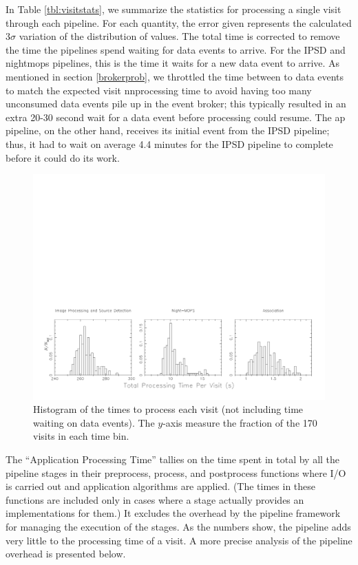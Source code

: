 In Table \ref{tbl:visitstats}, we summarize the statistics for processing
a single visit through each pipeline.  For each quantity, the error
given represents the calculated $3\sigma$ variation of the
distribution of values.  The total time is corrected to remove the
time the pipelines spend waiting for data events to arrive.  For the
IPSD and nightmops pipelines, this is the time it waits for a new data
event to arrive.  As mentioned in section \ref{brokerprob}, we
throttled the time between to data events to match the expected visit
nnprocessing time to avoid having too many unconsumed data events pile
up in the event broker; this typically resulted in an extra 20-30
second wait for a data event before processing could resume.  The ap
pipeline, on the other hand, receives its initial event from the IPSD
pipeline; thus, it had to wait on average 4.4 minutes for the IPSD
pipeline to complete before it could do its work.

\begin{figure}[htbp]
\begin{center}
\includegraphics[width=\textwidth,bb=0 0 800 276,viewport=25 25 775 250,clip]{images/visitdist.pdf}
\caption{Histogram of the times to process each visit (not including
  time waiting on data events).  The $y$-axis measure the fraction of
  the 170 visits in each time bin.  
\label{fig:visitdist}}
\end{center}
\end{figure}


The ``Application Processing Time'' tallies on the time spent in total
by all the pipeline stages in their preprocess, process, and
postprocess functions where I/O is carried out and application
algorithms are applied.  (The times in these functions are included
only in cases where a stage actually provides an implementations for
them.)  It excludes the overhead by the pipeline framework for
managing the execution of the stages.  As the numbers show, the
pipeline adds very little to the processing time of a visit.  A more
precise analysis of the pipeline overhead is presented below.  


